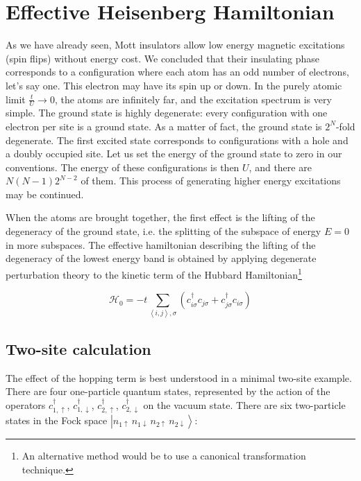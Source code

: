 \section{Effective Heisenberg Hamiltonian}\label{sec:effectiveHeisenberg}

As we have already seen, Mott insulators allow low energy magnetic excitations (spin flips) without energy cost.
We concluded that their insulating phase corresponds to a configuration where each atom has an odd number of electrons, let's say one.
This electron may have its spin up or down.
In the purely atomic limit $\frac{t}{U} \rightarrow 0$, the atoms are infinitely far, and the excitation spectrum is very simple.
The ground state is highly degenerate: every configuration with one electron per site is a ground state.
As a matter of fact, the ground state is $2^N$-fold degenerate.
The first excited state corresponds to configurations with a hole and a doubly occupied site.
Let us set the energy of the ground state to zero in our conventions.
The energy of these configurations is then $U$, and there are $N(N-1)2^{N-2}$ of them.
This process of generating higher energy excitations may be continued.

When the atoms are brought together, the first effect is the lifting of the degeneracy of the ground state, i.e. the splitting of the subspace of energy $E = 0$ in more subspaces.
The effective hamiltonian describing the lifting of the degeneracy of the lowest energy band is obtained by applying degenerate perturbation theory \cite{mila_physique_2007} to the kinetic term of the Hubbard Hamiltonian\footnote{An alternative method would be to use a canonical transformation technique.}

\begin{equation}
\mathcal{H}_0 = - t \sum_{\left\langle i, j \right\rangle, \sigma} ( c_{i\sigma}^\dagger c_{j\sigma} + c_{j\sigma}^\dagger c_{i\sigma} ) 
\end{equation}

\subsection{Two-site calculation}

The effect of the hopping term is best understood in a minimal two-site example.
There are four one-particle quantum states, represented by the action of the operators $c_{1,\uparrow}^\dagger$, $c_{1,\downarrow}^\dagger$, $c_{2,\uparrow}^\dagger$, $c_{2,\downarrow}^\dagger$ on the vacuum state.
There are six two-particle states in the Fock space $\left| n_{1\uparrow} \,  n_{1\downarrow} \,  n_{2\uparrow} \, n_{2\downarrow} \right\rangle$:

